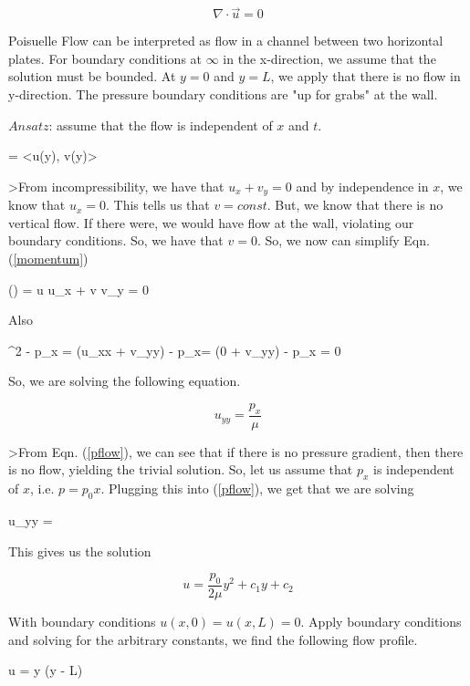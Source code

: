 \documentclass[]{article}
\numberwithin{equation}{section}		%
\let\[\equation
\let\]\endequation
\begin{document}
\begin{equation}\label{continuity}
	\nabla \cdot \vec{u} = 0
\end{equation}

Poisuelle Flow can be interpreted as flow in a channel between two horizontal plates. For boundary conditions at $\infty$
in the x-direction, we assume that the solution must be bounded. At $y = 0$ and $y = L$, we apply that there is no flow in
y-direction.  The pressure boundary conditions are "up for grabs" at the wall.

$Ansatz$: assume that the flow is independent of $x$ and $t$.

\[
	 = <u(y), v(y)>
\]

>From incompressibility, we have that $u_x + v_y = 0$ and by independence in $x$, we know that $u_x = 0$. This tells
us that $v = const$.  But, we know that there is no vertical flow. If there were, we would have flow at the wall, violating
our boundary conditions. So, we have that $v = 0$. So, we now can simplify Eqn. (\ref{momentum})

\[
	(\cdot \nabla)  = u \cdot u_x + v \cdot v_y = 0
\]

Also

\[
	 \mu \nabla^2  - p_x = \mu(u_{xx} + v_{yy}) - p_x= \mu(0 + v_yy) - p_x = 0
\]

So, we are solving the following equation.

\begin{equation}\label{pflow}
u_{yy} = \frac{p_x}{\mu}
\end{equation}

>From Eqn. (\ref{pflow}), we can see that if there is no pressure gradient, then there is no flow, yielding the trivial
solution.  So, let us assume that $p_x$ is independent of $x$, i.e. $p = p_0 x$.  Plugging this into (\ref{pflow}), we
get that we are solving

\[
	u_{yy} = 
\]

This gives us the solution

\begin{equation}\label{pflow_soln1}
u = \frac{p_0}{2 \mu}y^2 + c_1 y + c_2
\end{equation}

With boundary conditions $u(x,0) = u(x,L) = 0$. Apply boundary conditions and solving for the arbitrary constants, we find
the following flow profile.

\[
	u = y (y - L)
\]
\end{document}
